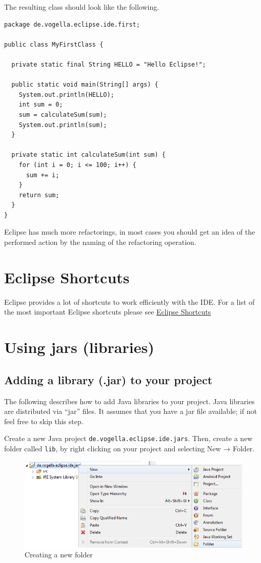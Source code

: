 The resulting class should look like the following.

\begin{lstlisting}
package de.vogella.eclipse.ide.first;

public class MyFirstClass {

  private static final String HELLO = "Hello Eclipse!";

  public static void main(String[] args) {
    System.out.println(HELLO);
    int sum = 0;
    sum = calculateSum(sum);
    System.out.println(sum);
  }

  private static int calculateSum(int sum) {
    for (int i = 0; i <= 100; i++) {
      sum += i;
    }
    return sum;
  }
} 
\end{lstlisting}

Eclipse has much more refactorings, in most cases you should get an idea
of the performed action by the naming of the refactoring operation.

\section{Eclipse Shortcuts}

Eclipse provides a lot of shortcuts to work efficiently with the IDE.
For a list of the most important Eclipse shortcuts please see
\href{http://www.vogella.com/articles/EclipseShortcuts/article.html}{Eclipse
Shortcuts}

\section{Using jars (libraries)}

\subsection{Adding a library (.jar) to your project}

The following describes how to add Java libraries to your project. Java
libraries are distributed via ``jar'' files. It assumes that you have a
jar file available; if not feel free to skip this step.

Create a new Java project \texttt{de.vogella.eclipse.ide.jars}. Then,
create a new folder called \texttt{lib}, by right clicking on your
project and selecting New → Folder.

\begin{figure}[htbp]
\centering
\includegraphics[scale=.5]{images/folder}
\caption{Creating a new folder}
\end{figure}

